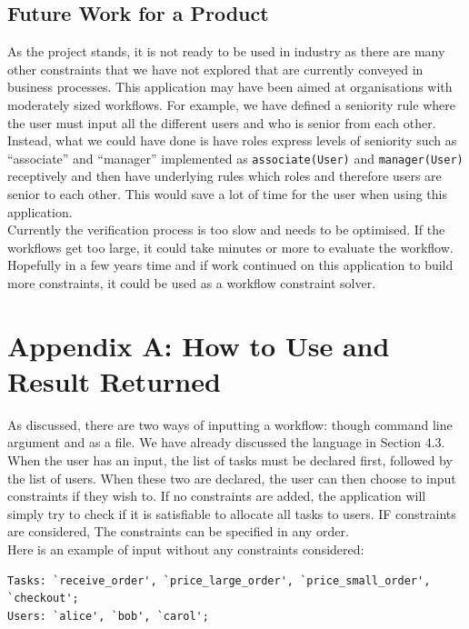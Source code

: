 \documentclass[a4paper]{report}
\begin{document}
\section{Future Work for a Product}
As the project stands, it is not ready to be used in industry as there are many other constraints that we have not explored that are currently conveyed in business processes. This application may have been aimed at organisations with moderately sized workflows. For example, we have defined a seniority rule where the user must input all the different users and who is senior from each other. Instead, what we could have done is have roles express levels of seniority such as ``associate'' and ``manager'' implemented as \texttt{associate(User)} and \texttt{manager(User)} receptively and then have underlying rules which roles and therefore users are senior to each other. This would save a lot of time for the user when using this application.\\

Currently the verification process is too slow and needs to be optimised. If the workflows get too large, it could take minutes or more to evaluate the workflow. \\

Hopefully in a few years time and if work continued on this application to build more constraints, it could be used as a workflow constraint solver. \\

\chapter{Appendix A: How to Use and Result Returned}
As discussed, there are two ways of inputting a workflow: though command line argument and as a file. We have already discussed the language in Section 4.3.\\

When the user has an input, the list of tasks must be declared first, followed by the list of users. When these two are declared, the user can then choose to input constraints if they wish to. If no constraints are added, the application will simply try to check if it is satisfiable to allocate all tasks to users. IF constraints are considered, The constraints can be specified in any order.\\

Here is an example of input without any constraints considered:
\begin{lstlisting}[frame=single]
Tasks: `receive_order', `price_large_order', `price_small_order', `checkout';
Users: `alice', `bob', `carol';
\end{lstlisting}
\end{document}
